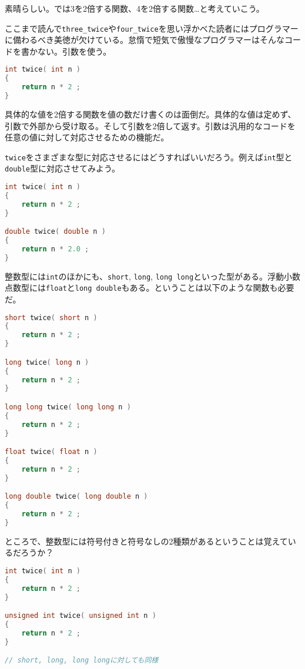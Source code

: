 素晴らしい。では3を2倍する関数、4を2倍する関数\ldots と考えていこう。

ここまで読んで\texttt{three\_twice}や\texttt{four\_twice}を思い浮かべた読者にはプログラマーに備わるべき美徳が欠けている。怠惰で短気で傲慢なプログラマーはそんなコードを書かない。引数を使う。

\begin{lstlisting}[language={C++}]
int twice( int n )
{
    return n * 2 ;
}
\end{lstlisting}

具体的な値を2倍する関数を値の数だけ書くのは面倒だ。具体的な値は定めず、引数で外部から受け取る。そして引数を2倍して返す。引数は汎用的なコードを任意の値に対して対応させるための機能だ。


\texttt{twice}をさまざまな型に対応させるにはどうすればいいだろう。例えば\texttt{int}型と\texttt{double}型に対応させてみよう。

\begin{lstlisting}[language={C++}]
int twice( int n )
{
    return n * 2 ;
}

double twice( double n )
{
    return n * 2.0 ;
}
\end{lstlisting}

整数型には\texttt{int}のほかにも、\texttt{short}, \texttt{long}, \texttt{long long}といった型がある。浮動小数点数型には\texttt{float}と\texttt{long double}もある。ということは以下のような関数も必要だ。

\ifTombow\enlargethispage{5mm}\fi
\begin{lstlisting}[language={C++}]
short twice( short n )
{
    return n * 2 ;
}

long twice( long n )
{
    return n * 2 ;
}

long long twice( long long n )
{
    return n * 2 ;
}

float twice( float n )
{
    return n * 2 ;
}

long double twice( long double n )
{
    return n * 2 ;
}
\end{lstlisting}

ところで、整数型には符号付きと符号なしの2種類があるということは覚えているだろうか？

\begin{lstlisting}[language={C++}]
int twice( int n )
{
    return n * 2 ;
}

unsigned int twice( unsigned int n )
{
    return n * 2 ;
}

// short, long, long longに対しても同様
\end{lstlisting}


